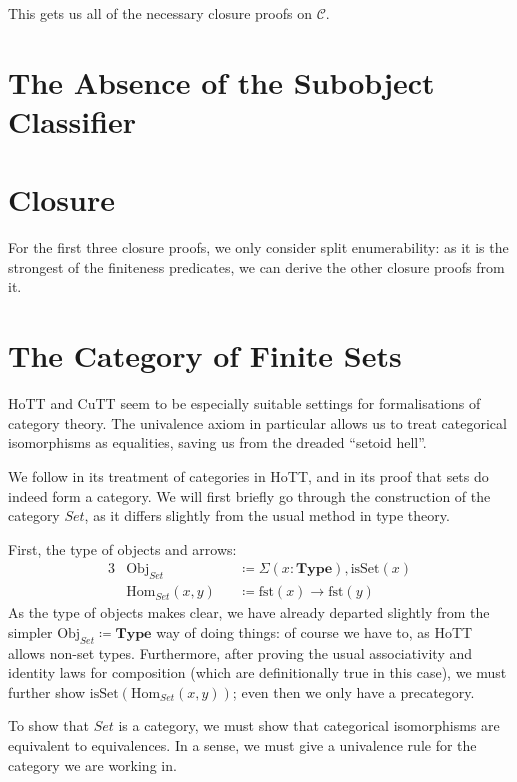 This gets us all of the necessary closure proofs on \(\mathcal{C}\).
\section{The Absence of the Subobject Classifier}
\begin{agdalisting} \label{filter-subobject}
\end{agdalisting}


\section{Closure}
For the first three closure proofs, we only consider split enumerability:
as it is the strongest of the finiteness predicates, we can derive the other
closure proofs from it.

\section{The Category of Finite Sets}
HoTT and CuTT seem to be especially suitable settings for formalisations of
category theory.
The univalence axiom in particular allows us to treat categorical isomorphisms
as equalities, saving us from the dreaded ``setoid hell''.

We follow \cite[chapter 9]{hottbook} in its treatment of
categories in HoTT, and in its proof that sets do indeed form a category.
We will first briefly go through the construction of the category
\(\mathit{Set}\), as it differs slightly from the usual method in type theory.

First, the type of objects and arrows:
\begin{alignat}{3}
  &\text{Obj}_\mathit{Set}      &&\coloneqq \Sigma(x : \mathbf{Type}) , \text{isSet}(x) \\
  &\text{Hom}_\mathit{Set}(x , y) &&\coloneqq  \text{fst}(x) \rightarrow \text{fst}(y)
\end{alignat}
As the type of objects makes clear, we have already departed slightly from the
simpler \(\text{Obj}_\mathit{Set} \coloneqq \mathbf{Type}\) way of doing things:
of course we have to, as HoTT allows non-set types.
Furthermore, after proving the usual associativity and identity laws for
composition (which are definitionally true in this case), we must further show
\(\text{isSet}(\text{Hom}_\mathit{Set}(x,y))\); even then we only have a
precategory.

To show that \(\mathit{Set}\) is a category, we must show that categorical
isomorphisms are equivalent to equivalences.
In a sense, we must give a univalence rule for the category we are working in.

